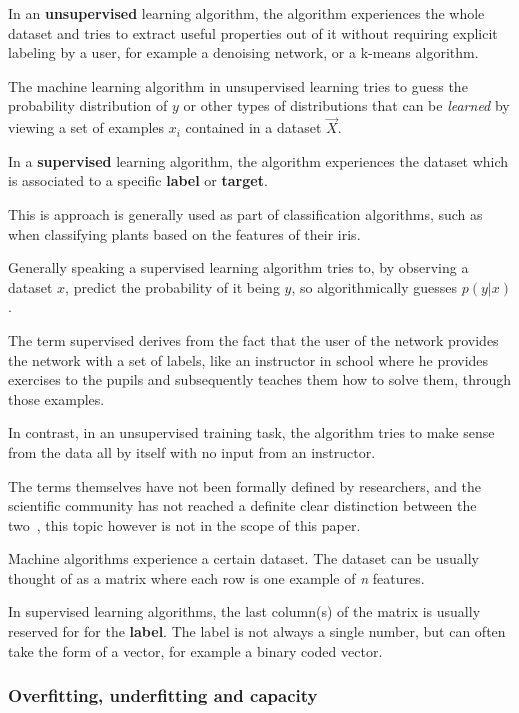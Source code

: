 \documentclass[12pt]{article}
\begin{document}
In an \textbf{unsupervised} learning algorithm, the algorithm experiences the whole dataset and tries to extract useful properties out of it without requiring explicit labeling by a user, for example a denoising network, or a k-means algorithm. 

The machine learning algorithm in unsupervised learning tries to guess the probability distribution of $y$ or other types of distributions that can be \emph{learned} by viewing a set of examples $x_i$ contained in a dataset $\vec{X}$.

In a \textbf{supervised} learning algorithm, the algorithm experiences the dataset which is associated to a specific \textbf{label} or \textbf{target}. 

This is approach is generally used as part of classification algorithms, such as when classifying plants based on the features of their iris. 

Generally speaking a supervised learning algorithm tries to, by observing a dataset $x$, predict the probability of it being $y$, so algorithmically guesses $p(y|x)$. 

The term supervised derives from the fact that the user of the network provides the network with a set of labels, like an instructor in school where he provides exercises to the pupils and subsequently teaches them how to solve them, through those examples.

In contrast, in an unsupervised training task, the algorithm tries to make sense from the data all by itself with no input from an instructor. 

The terms themselves have not been formally defined by researchers, and the scientific community has not reached a definite clear distinction between the two~\citep{deeplearningbook}, this topic however is not in the scope of this paper.

Machine algorithms experience a certain dataset. The dataset can be usually thought of as a matrix where each row is one example of \textit{n} features. 

In supervised learning algorithms, the last column(s) of the matrix is usually reserved for for the \textbf{label}. The label is not always a single number, but can often take the form of a vector, for example a binary coded vector.

\subsubsection{Overfitting, underfitting and capacity}
\label{subsub:overfitting}
\end{document}
